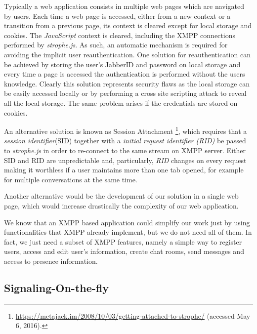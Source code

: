     Typically a web application consists in multiple web pages which are navigated by users. Each time a web page is accessed, either from a new context or a transition from a previous page, its context is cleared except for local storage and cookies. The \emph{JavaScript} context is cleared, including the \ac{XMPP} connections performed by \emph{strophe.js}. As such, an automatic mechanism is required for avoiding the implicit user reauthentication.
    One solution for reauthentication can be achieved by storing the user's JabberID and password on local storage and every time a page is accessed the authentication is performed without the users knowledge. Clearly this solution represents security flaws as the local storage can be easily accessed locally or by performing a cross site scripting attack to reveal all the local storage. The same problem arises if the credentials are stored on cookies.

    An alternative solution is known as Session Attachment \footnote{\url{https://metajack.im/2008/10/03/getting-attached-to-strophe/} (accessed May 6, 2016).}, which requires that a \textit{session identifier}(SID) together with a \textit{initial request identifier (RID)} be passed to \emph{strophe.js} in order to re-connect to the same stream on \ac{XMPP} server. Either SID and RID are unpredictable and, particularly, \textit{RID} changes on every request making it worthless if a user maintains more than one tab opened, for example for multiple conversations at the same time.
    
    Another alternative would be the development of our solution in a single web page, which would increase drastically the complexity of our web application.

    We know that an \ac{XMPP} based application could simplify our work just by using functionalities that \ac{XMPP} already implement, but  we do not need all of them. In fact, we just need a subset of \ac{XMPP} features, namely a simple way to register users, access and edit user's information, create chat rooms, send messages and access to presence information.


  \subsection{Signaling-On-the-fly}


